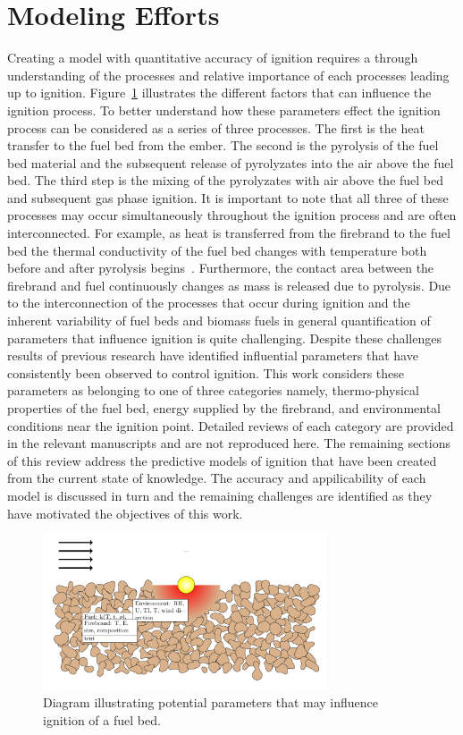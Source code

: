     
\section{Modeling Efforts}
    Creating a model with quantitative accuracy of ignition requires a through understanding of the processes and relative importance of each processes leading up to ignition.    Figure~\ref{fig:ignitionDiagram} illustrates the different factors that can influence the ignition process. To better understand how these parameters effect the ignition process can be considered as a series of three processes.  The first is the heat transfer to the fuel bed from the ember. The second is the pyrolysis of the fuel bed material and the subsequent release of pyrolyzates into the air above the fuel bed. The third step is the mixing of the pyrolyzates with air above the fuel bed and subsequent gas phase ignition. It is important to note that all three of these processes may occur simultaneously throughout the ignition process and are often interconnected. For example, as heat is transferred from the firebrand to the fuel bed the thermal conductivity of the fuel bed changes with temperature both before and after pyrolysis begins~\cite{Fjellerup2003}. Furthermore, the contact area between the firebrand and fuel continuously changes as mass is released due to pyrolysis. Due to the interconnection of the processes that occur during ignition and the inherent variability of fuel beds and biomass fuels in general quantification of parameters that influence ignition is quite challenging. Despite these challenges results of previous research have identified influential parameters that have consistently been observed to control ignition. This work considers these parameters as belonging to one of three categories namely, thermo-physical properties of the fuel bed, energy supplied by the firebrand, and environmental conditions near the ignition point. Detailed reviews of each category are provided in the relevant manuscripts and are not reproduced here. The remaining sections of this review address the predictive models of ignition that have been created from the current state of knowledge. The accuracy and appilicability of each model is discussed in turn and the remaining challenges are identified as they have motivated the objectives of this work. 
        \begin{figure}[hpbt]
            \centering
                \includegraphics[width=0.75\textwidth]{Figures/dissertationBed.pdf}
            \caption{Diagram illustrating potential parameters that may influence ignition of a fuel bed.}
            \label{fig:ignitionDiagram}
        \end{figure}
    

